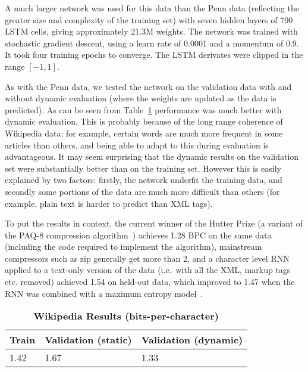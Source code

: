 \documentclass{article}
\newcommand{\ie}{i.e.\ }
\newcommand{\tlabel}[1]{\label{tab:#1}}
\newcommand{\tref}[1]{Table~\ref{tab:#1}}
\newcommand{\capt}[2]{\caption[#1]{\textbf{#1}#2}}
\begin{document}
A much larger network was used for this data than the Penn data (reflecting the greater size and complexity of the training set) with seven hidden layers of 700 LSTM cells, giving approximately 21.3M weights.
The network was trained with stochastic gradient descent, using a learn rate of 0.0001 and a momentum of 0.9.
It took four training epochs to converge.
The LSTM derivates were clipped in the range $[-1,1]$.

As with the Penn data, we tested the network on the validation data with and without dynamic evaluation (where the weights are updated as the data is predicted).
As can be seen from \tref{wiki} performance was much better with dynamic evaluation.
This is probably because of the long range coherence of Wikipedia data; for example, certain words are much more frequent in some articles than others, and being able to adapt to this during evaluation is advantageous.
It may seem surprising that the dynamic results on the validation set were substantially better than on the training set.
However this is easily explained by two factors: firstly, the network underfit the training data, and secondly some portions of the data are much more difficult than others (for example, plain text is harder to predict than XML tags).

To put the results in context, the current winner of the Hutter Prize (a variant of the PAQ-8 compression algorithm~\cite{knoll11paq}) achieves 1.28 BPC on the same data (including the code required to implement the algorithm), mainstream compressors such as zip generally get more than 2, and a character level RNN applied to a text-only version of the data (\ie with all the XML, markup tags etc. removed) achieved 1.54 on held-out data, which improved to 1.47 when the RNN was combined with a maximum entropy model~\cite{mikolov12subword}. 

\begin{table}
\centering
\capt{Wikipedia Results (bits-per-character)}{}
\tlabel{wiki}
\vskip 0.15in
\begin{center}
\begin{sc}
\begin{tabular}{lll}
\hline
Train & Validation (static) & Validation (dynamic)\\
\hline
1.42 & 1.67 & 1.33\\
\hline
\end{tabular}
\end{sc}
\end{center}
\end{table}
\end{document}

